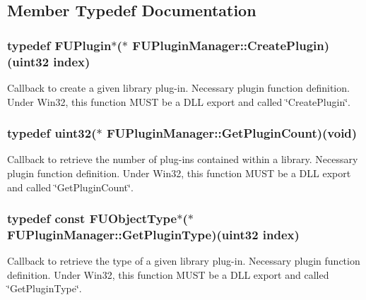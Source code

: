 \subsection{Member Typedef Documentation}
\hypertarget{classFUPluginManager_a8e4ad834c03cad334f3bbd6158416a43}{
\subsubsection[{CreatePlugin}]{\setlength{\rightskip}{0pt plus 5cm}typedef {\bf FUPlugin}$\ast$($\ast$ {\bf FUPluginManager::CreatePlugin})(uint32 index)}}
\label{classFUPluginManager_a8e4ad834c03cad334f3bbd6158416a43}
Callback to create a given library plug-\/in. Necessary plugin function definition. Under Win32, this function MUST be a DLL export and called \char`\"{}CreatePlugin\char`\"{}. \hypertarget{classFUPluginManager_aa7465d51db4f1f1e0386310ae6922250}{
\subsubsection[{GetPluginCount}]{\setlength{\rightskip}{0pt plus 5cm}typedef uint32($\ast$ {\bf FUPluginManager::GetPluginCount})(void)}}
\label{classFUPluginManager_aa7465d51db4f1f1e0386310ae6922250}
Callback to retrieve the number of plug-\/ins contained within a library. Necessary plugin function definition. Under Win32, this function MUST be a DLL export and called \char`\"{}GetPluginCount\char`\"{}. \hypertarget{classFUPluginManager_ad253785d39bca14d77ddf9d9181e7fb1}{
\subsubsection[{GetPluginType}]{\setlength{\rightskip}{0pt plus 5cm}typedef const {\bf FUObjectType}$\ast$($\ast$ {\bf FUPluginManager::GetPluginType})(uint32 index)}}
\label{classFUPluginManager_ad253785d39bca14d77ddf9d9181e7fb1}
Callback to retrieve the type of a given library plug-\/in. Necessary plugin function definition. Under Win32, this function MUST be a DLL export and called \char`\"{}GetPluginType\char`\"{}. 

